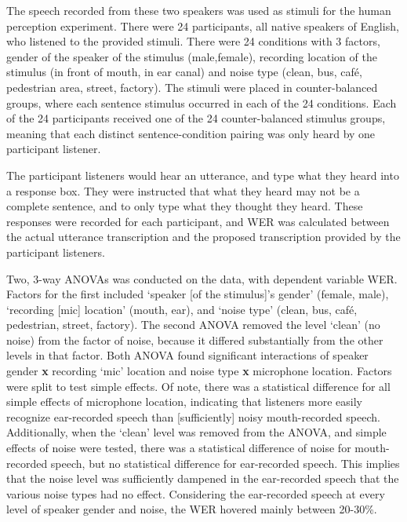 The speech recorded from these two speakers was used as stimuli for the human perception experiment.  There were 24 participants, all native speakers of English, who listened to the provided stimuli.  There were 24 conditions with 3 factors, gender of the speaker of the stimulus (male,female), recording location of the stimulus (in front of mouth, in ear canal) and noise type (clean, bus, caf\'{e}, pedestrian area, street, factory).  The stimuli were placed in counter-balanced groups, where each sentence stimulus occurred in each of the 24 conditions.  Each of the 24 participants received one of the 24 counter-balanced stimulus groups, meaning that each distinct sentence-condition pairing was only heard by one participant listener.

The participant listeners would hear an utterance, and type what they heard into a response box.  They were instructed that what they heard may not be a complete sentence, and to only type what they thought they heard.  These responses were recorded for each participant, and WER was calculated between the actual utterance transcription and the proposed transcription provided by the participant listeners.

Two, 3-way ANOVAs was conducted on the data, with dependent variable WER.  Factors for the first included `speaker [of the stimulus]'s gender' (female, male), `recording [mic] location' (mouth, ear), and `noise type' (clean, bus, caf\'{e}, pedestrian, street, factory).  The second ANOVA removed the level `clean' (no noise) from the factor of noise, because it differed substantially from the other levels in that factor.  Both ANOVA found significant interactions of speaker gender \textbf{x} recording `mic' location and noise type \textbf{x} microphone location.  Factors were split to test simple effects.  Of note, there was a statistical difference for all simple effects of microphone location, indicating that listeners more easily recognize ear-recorded speech than [sufficiently] noisy mouth-recorded speech.  Additionally, when the `clean' level was removed from the ANOVA, and simple effects of noise were tested, there was a statistical difference of noise for mouth-recorded speech, but no statistical difference for ear-recorded speech.  This implies that the noise level was sufficiently dampened in the ear-recorded speech that the various noise types had no effect.  Considering the ear-recorded speech at every level of speaker gender and noise, the WER hovered mainly between 20-30\%.

